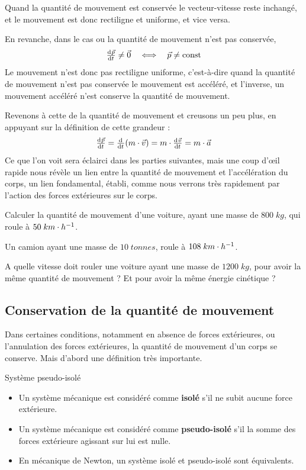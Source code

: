 \documentclass[11pt,a4paper]{article}
\begin{document}
Quand la quantité de mouvement est conservée le vecteur-vitesse reste inchangé, et le mouvement est donc rectiligne et uniforme, et vice versa. 

\endgroup

En revanche, dans le cas ou la quantité de mouvement n'est pas conservée, 
\[
\od{\vp}{t} \ne \Vec{0} \quad \Longleftrightarrow\quad \vp \ne \text{const}
\]
Le mouvement n'est donc pas rectiligne uniforme, c'est-à-dire quand la quantité de mouvement n'est pas conservée le mouvement est accéléré, et l'inverse, un mouvement accéléré n'est conserve la quantité de mouvement. 

Revenons à cette de la quantité de mouvement et creusons un peu plus, en appuyant sur la définition de cette grandeur : 
\[ \od{\vp}{t} = \od{}{t}(m\cdot\vv) = m\cdot\od{\vv}{t} = m\cdot\va \]
Ce que l'on voit sera éclairci dans les parties suivantes, mais une coup d'\oe il rapide nous révèle un lien entre la quantité de mouvement et l'accélération du corps, un lien fondamental, établi, comme nous verrons très rapidement par l'action des forces extérieures sur le corps. 

\begin{exo}
Calculer la quantité de mouvement d’une voiture, ayant une masse de $800\; kg$, qui roule à $50\; km\cdot h^{-1}$. 
\vspace{2.5cm}
\end{exo}

\begin{exo}
Un camion ayant une masse de  $10\; tonnes$, roule à $108\; km\cdot h^{-1} $. 

A quelle vitesse doit rouler une voiture ayant une masse de $1200\; kg$, pour avoir la même quantité de mouvement ? Et pour avoir la même énergie cinétique ? 
\vspace{3cm}
\end{exo}

\subsection{Conservation de la quantité de mouvement}

Dans certaines conditions, notamment en absence de forces extérieures, ou l'annulation des forces extérieures, la quantité de mouvement d'un corps se conserve.  Mais d'abord une définition très importante.

\begin{defn}{Système pseudo-isolé}
\begin{itemize}
    \item Un système mécanique est considéré comme \textbf{isolé} s'il ne subit aucune force extérieure. 
    \item Un système mécanique est considéré comme \textbf{pseudo-isolé} s'il la somme des forces extérieure agissant sur lui est nulle. 
    \item En mécanique de Newton, un système isolé et pseudo-isolé sont équivalents. 
\end{itemize}
\end{defn}
\end{document}
